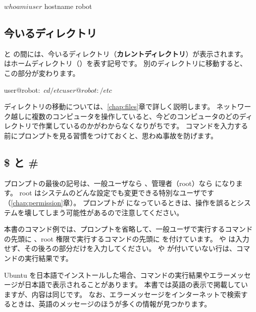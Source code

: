 \begin{terminal}[ユーザ名とホスト名を確認する]
$ whoami
user
$ hostname
robot
\end{terminal}

\subsection{今いるディレクトリ}

\cmd{:} と \cmd{\$} の間には、今いるディレクトリ（\textbf{カレントディレクトリ}）が表示されます。
\cmd{\textasciitilde} はホームディレクトリ（）を表す記号です。
別のディレクトリに移動すると、この部分が変わります。

\begin{terminal}[移動するとプロンプトが変わる]
user@robot:~$ cd /etc
user@robot:/etc$
\end{terminal}

ディレクトリの移動については、\ref{chap:files}章で詳しく説明します。
ネットワーク越しに複数のコンピュータを操作していると、今どのコンピュータのどのディレクトリで作業しているのかがわからなくなりがちです。
コマンドを入力する前にプロンプトを見る習慣をつけておくと、思わぬ事故を防げます。

\subsection{\$ と \#}

プロンプトの最後の記号は、一般ユーザなら \cmd{\$}、管理者（root）なら \cmd{\#} になります。
root はシステムのどんな設定でも変更できる特別なユーザです（\ref{chap:permission}章）。
プロンプトが \cmd{\#} になっているときは、操作を誤るとシステムを壊してしまう可能性があるので注意してください。

\begin{point}[本書でのコマンドの表記]
  本書のコマンド例では、プロンプトを省略して、一般ユーザで実行するコマンドの先頭に \cmd{\$}、root 権限で実行するコマンドの先頭に \cmd{\#} を付けています。
  \cmd{\$} や \cmd{\#} は入力せず、その後ろの部分だけを入力してください。
  \cmd{\$} や \cmd{\#} が付いていない行は、コマンドの実行結果です。
\end{point}


\begin{caution}[表示される言語について]
  Ubuntu を日本語でインストールした場合、コマンドの実行結果やエラーメッセージが日本語で表示されることがあります。
  本書では英語の表示で掲載していますが、内容は同じです。
  なお、エラーメッセージをインターネットで検索するときは、英語のメッセージのほうが多くの情報が見つかります。
\end{caution}

